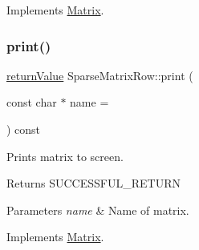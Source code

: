 Implements \hyperlink{class_matrix_a1f5595f0147658d9f79f92dd283dcbac}{Matrix}.

\mbox{\label{class_sparse_matrix_row_a471469c7fc2240bd379b8a3aa64634a9}} 
\subsubsection{\texorpdfstring{print()}{print()}}
{\footnotesize\ttfamily \hyperlink{_message_handling_8hpp_a81d556f613bfbabd0b1f9488c0fa865e}{return\+Value} Sparse\+Matrix\+Row\+::print (\begin{DoxyParamCaption}\item[{const char $\ast$}]{name = {} }\end{DoxyParamCaption}) const\hspace{0.3cm}{\ttfamily [virtual]}}

Prints matrix to screen. \begin{DoxyReturn}{Returns}
S\+U\+C\+C\+E\+S\+S\+F\+U\+L\+\_\+\+R\+E\+T\+U\+RN 
\end{DoxyReturn}

\begin{DoxyParams}{Parameters}
{\em name} & Name of matrix. \\
\hline
\end{DoxyParams}


Implements \hyperlink{class_matrix_acc4e1dc7fa487a0c2638d88236fe35f8}{Matrix}.

\mbox{\label{class_sparse_matrix_row_af3b6548008bb5921a205f19ca95c05d9}} 
